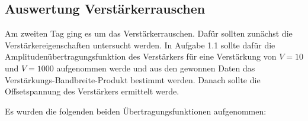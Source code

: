 \documentclass{article}						%
\begin{document}
		\clearpage
		
	\subsection{Auswertung Verstärkerrauschen}
		Am zweiten Tag ging es um das Verstärkerrauschen. Dafür sollten zunächst die Verstärkereigenschaften untersucht werden. In Aufgabe 1.1 sollte dafür die Amplitudenübertragungsfunktion des Verstärkers für eine Verstärkung von $ V = 10 $ und $ V = 1000 $ aufgenommen werde und aus den gewonnen Daten das Verstärkungs-Bandbreite-Produkt bestimmt werden. Danach sollte die Offsetspannung des Verstärkers ermittelt werde.
		
		Es wurden die folgenden beiden Übertragungsfunktionen aufgenommen:
		
		\begin{figure}[h!]
		\end{figure}
		
\end{document}

